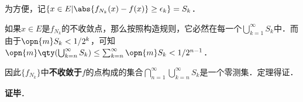 为方便，记$\{x\in E|\abs{f_{N_k}(x)-f(x)}\geq \epsilon_k\}=S_k$．

如果$x\in E$是$f_{N_k}$的不收敛点，那么按照构造规则，它必然在每一个$\bigcup^\infty_{k=1}S_k$中．而由于$\opn{m}S_k<1/2^k$，可知$\opn{m}\qty(\bigcup^\infty_{k=n}S_k)\leq \sum^{\infty}_{k=n}\opn{m}S_k<1/2^{n-1}$．

因此$\{f_{N_k}\}$中\textbf{不收敛于}$f$的点构成的集合$\bigcap^\infty_{n=1}\bigcup^\infty_{k=n}S_k$是一个零测集．定理得证．



\textbf{证毕}．





